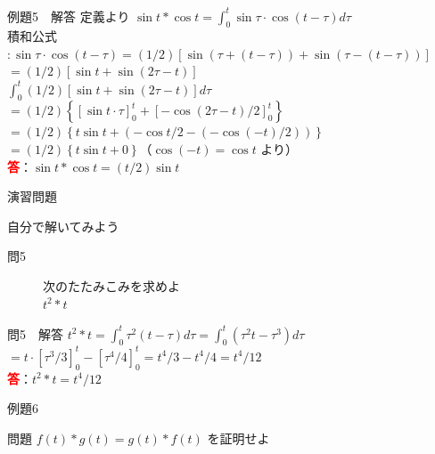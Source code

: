 \documentclass[professionalfonts]{beamer}
\begin{document}
\begin{frame}{例題5　解答}
  定義より $\sin t * \cos t = \int_{0}^t \sin \tau \cdot \cos(t-\tau) d\tau$\\[4pt]
  積和公式 $: \sin \tau\cdot \cos(t-\tau) = (1/2)[\sin(\tau+(t-\tau)) + \sin(\tau-(t-\tau))]$\\[4pt]
  $= (1/2)[\sin t + \sin(2\tau-t)]$\\[4pt]
  $\int_{0}^t (1/2)[\sin t + \sin(2\tau-t)]d\tau$\\[4pt]
  $= (1/2)\left\{ [\sin t \cdot \tau]_{0}^t + [-\cos(2\tau-t)/2]_{0}^t \right\}$\\[4pt]
  $= (1/2)\left\{ t\sin t + (-\cos t/2 - (-\cos(-t)/2)) \right\}$\\[4pt]
  $= (1/2)\left\{ t\sin t + 0 \right\}$（$\cos(-t) = \cos t$ より）
  \\[8pt]\textcolor{red}{\textbf{答}}：$\sin t * \cos t = (t/2) \sin t$
\end{frame}

\begin{frame}{演習問題}
  \begin{exampleblock}{自分で解いてみよう}
  \begin{description}
    \item[問5] 次のたたみこみを求めよ\\
    $t^{2} * t$\\
  \end{description}
  \end{exampleblock}
\end{frame}

\begin{frame}{問5　解答}
  $t^{2} * t = \int_{0}^t \tau^{2}(t-\tau) d\tau = \int_{0}^t (\tau^{2}t - \tau^{3}) d\tau$\\[4pt]
  $= t\cdot[\tau^{3}/3]_{0}^t - [\tau^{4}/4]_{0}^t = t^{4}/3 - t^{4}/4 = t^{4}/12$
  \\[8pt]\textcolor{red}{\textbf{答}}：$t^{2} * t = t^{4}/12$
\end{frame}

\begin{frame}{例題6}
  \begin{exampleblock}{問題}
    $f(t) * g(t) = g(t) * f(t)$ を証明せよ\\[2pt]
  \end{exampleblock}
\end{frame}
\end{document}
